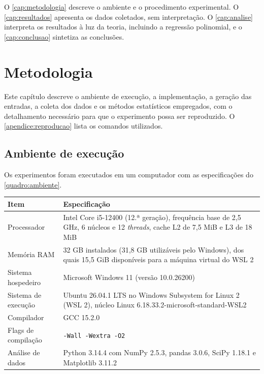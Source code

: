 \documentclass[
    12pt,
    oneside,
    a4paper,
    openany,
    chapter=TITLE,
    english,
    brazil
]{abntex2}
\begin{document}
O \autoref{cap:metodologia} descreve o ambiente e o procedimento experimental. O \autoref{cap:resultados} apresenta os dados coletados, sem interpretação. O \autoref{cap:analise} interpreta os resultados à luz da teoria, incluindo a regressão polinomial, e o \autoref{cap:conclusao} sintetiza as conclusões.

\chapter{Metodologia}
\label{cap:metodologia}

Este capítulo descreve o ambiente de execução, a implementação, a geração das entradas, a coleta dos dados e os métodos estatísticos empregados, com o detalhamento necessário para que o experimento possa ser reproduzido. O \autoref{apendice:reproducao} lista os comandos utilizados.

\section{Ambiente de execução}

Os experimentos foram executados em um computador com as especificações do \autoref{quadro:ambiente}.

\begin{quadro}[htbp]
    \caption{Especificações do ambiente de execução}
    \label{quadro:ambiente}
    \centering
    \small
    \begin{tabular}{|l|p{9.5cm}|}
        \hline
        \textbf{Item} & \textbf{Especificação} \\ \hline
        Processador & Intel Core i5-12400 (12.ª geração), frequência base de 2,5 GHz, 6 núcleos e 12 \textit{threads}, cache L2 de 7,5 MiB e L3 de 18 MiB \\ \hline
        Memória RAM & 32 GB instalados (31,8 GB utilizáveis pelo Windows), dos quais 15,5 GiB disponíveis para a máquina virtual do WSL 2 \\ \hline
        Sistema hospedeiro & Microsoft Windows 11 (versão 10.0.26200) \\ \hline
        Sistema de execução & Ubuntu 26.04.1 LTS no Windows Subsystem for Linux 2 (WSL 2), núcleo Linux 6.18.33.2-microsoft-standard-WSL2 \\ \hline
        Compilador & GCC 15.2.0 \\ \hline
        Flags de compilação & \texttt{-Wall -Wextra -O2} \\ \hline
        Análise de dados & Python 3.14.4 com NumPy 2.5.3, pandas 3.0.6, SciPy 1.18.1 e Matplotlib 3.11.2 \\ \hline
    \end{tabular}
\end{quadro}
\end{document}
